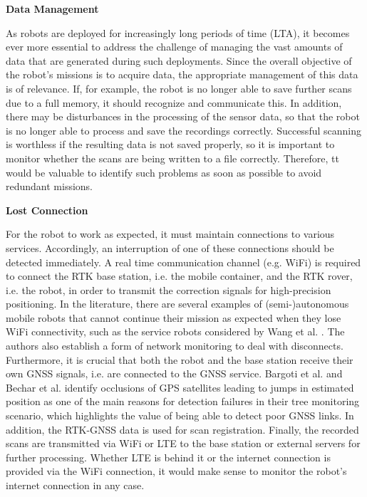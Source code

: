 \documentclass[english, master, utf8]{base/thesis_KBS}
\begin{document}
\noindent
\textbf{Data Management}\newline

\noindent
As robots are deployed for increasingly long periods of time (LTA), it becomes ever more essential to address the challenge of managing the vast amounts of data that are generated
during such deployments. \cite{Ambrus:2014} Since the overall objective of the robot's missions is to acquire data, the appropriate management of this data is of relevance.
If, for example, the robot is no longer able to save further scans due to a full memory, it should recognize and communicate this.
In addition, there may be disturbances in the processing of the sensor data, so that the robot is no longer able to process and save the recordings correctly.
Successful scanning is worthless if the resulting data is not saved properly, so it is important to monitor whether the scans are being written to a file correctly.
Therefore, tt would be valuable to identify such problems as soon as possible to avoid redundant missions.\newline

\noindent
\textbf{Lost Connection}\newline

\noindent
For the robot to work as expected, it must maintain connections to various services. Accordingly, an interruption of one of these connections should be detected immediately.
A real time communication channel (e.g. WiFi) is required to connect the RTK base station, i.e. the mobile container, and the RTK rover, i.e. the robot, in order to
transmit the correction signals for high-precision positioning. In the literature, there are several examples of (semi-)autonomous mobile robots that cannot continue their
mission as expected when they lose WiFi connectivity, such as the service robots considered by Wang et al. \cite{Wang:2018}. The authors also establish a form of network monitoring
to deal with disconnects.
Furthermore, it is crucial that both the robot and the base station receive their own GNSS signals,
i.e. are connected to the GNSS service. Bargoti et al. \cite{Bargoti:2015} and Bechar et al. \cite{Bechar:2016} identify occlusions of GPS satellites leading to jumps in estimated position as one of the main reasons
for detection failures in their tree monitoring scenario, which highlights the value of being able to detect poor GNSS links.
In addition, the RTK-GNSS data is used for scan registration. Finally, the recorded scans are transmitted via WiFi or LTE 
to the base station or external servers for further processing. Whether LTE is behind it or the internet connection is provided via the WiFi connection, it would make sense
to monitor the robot's internet connection in any case.\newline
\end{document}

